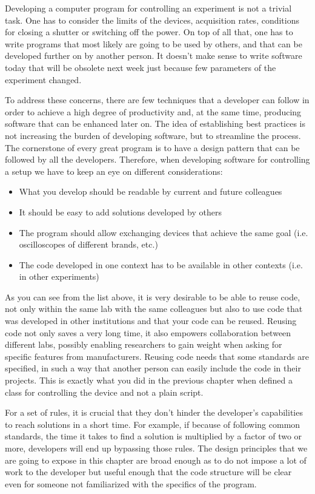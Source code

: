 Developing a computer program for controlling an experiment is not a
trivial task. One has to consider the limits of the devices, acquisition
rates, conditions for closing a shutter or switching off the power. On
top of all that, one has to write programs that most likely are going to
be used by others, and that can be developed further on by another
person. It doesn't make sense to write software today that will be
obsolete next week just because few parameters of the
experiment changed.

To address these concerns, there are few techniques that a developer can
follow in order to achieve a high degree of productivity and, at the
same time, producing software that can be enhanced later on. The idea of
establishing best practices is not increasing the burden of developing
software, but to streamline the process. The cornerstone of every great
program is to have a design pattern that can be followed by all the
developers. Therefore, when developing software for controlling a setup
we have to keep an eye on different considerations:

\begin{itemize}
\item
  What you develop should be readable by current and future colleagues
\item
  It should be easy to add solutions developed by others
\item
  The program should allow exchanging devices that achieve the same goal
  (i.e. oscilloscopes of different brands, etc.)
\item
  The code developed in one context has to be available in other
  contexts (i.e. in other experiments)
\end{itemize}

As you can see from the list above, it is very desirable to be able to
reuse code, not only within the same lab with the same colleagues but
also to use code that was developed in other institutions and that your
code can be reused. Reusing code not only saves a very long time, it
also empowers collaboration between different labs, possibly enabling
researchers to gain weight when asking for specific features from
manufacturers. Reusing code needs that some standards are specified, in
such a way that another person can easily include the code in their
projects. This is exactly what you did in the previous chapter when
defined a class for controlling the device and not a plain script.

For a set of rules, it is crucial that they don't hinder the developer's
capabilities to reach solutions in a short time. For example, if because
of following common standards, the time it takes to find a solution is
multiplied by a factor of two or more, developers will end up bypassing
those rules. The design principles that we are going to expose in this
chapter are broad enough as to do not impose a lot of work to the
developer but useful enough that the code structure will be clear even
for someone not familiarized with the specifics of the program.

